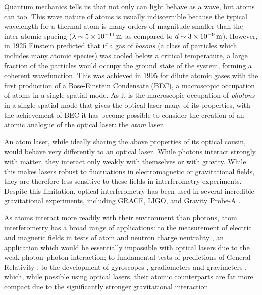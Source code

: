 Quantum mechanics tells us that not only can light behave as a wave, but atoms can too.  This wave nature of atoms is usually indiscernible because the typical wavelength for a thermal atom is many orders of magnitude smaller than the inter-atomic spacing ($\lambda \sim 5 \times\unit[10^{-11}]{m}$ as compared to $d \sim 3 \times\unit[10^{-9}]{m}$).  However, in 1925 Einstein predicted \citep{Einstein:1925} that if a gas of \emph{bosons} (a class of particles which includes many atomic species) was cooled below a critical temperature, a large fraction of the particles would occupy the ground state of the system, forming a coherent wavefunction.  This was achieved in 1995 for dilute atomic gases \citep{Anderson:1995vn,Bradley:1995ys,Davis:1995} with the first production of a Bose-Einstein Condensate (BEC), a macroscopic occupation of atoms in a single spatial mode.  As it is the macroscopic occupation of \emph{photons} in a single spatial mode that gives the optical laser many of its properties, with the achievement of BEC it has become possible to consider the creation of an atomic analogue of the optical laser: the \emph{atom} laser.

An atom laser, while ideally sharing the above properties of its optical cousin, would behave very differently to an optical laser.  While photons interact strongly with matter, they interact only weakly with themselves or with gravity.  While this makes lasers robust to fluctuations in electromagnetic or gravitational fields, they are therefore less sensitive to these fields in interferometry experiments.  Despite this limitation, optical interferometry has been used in several incredible gravitational experiments, including GRACE, LIGO, and Gravity Probe-A \citep{Vessot:1980}.

As atoms interact more readily with their environment than photons, atom interferometry has a broad range of applications: to the measurement of electric and magnetic fields in tests of atom and neutron charge neutrality \citep{Arvanitaki:2008}, an application which would be essentially impossible with optical lasers due to the weak photon--photon interaction; to fundamental tests of predictions of General Relativity \citep{Dimopoulos:2007uq}; to the development of gyroscopes \citep{Gustavson:1997}, gradiometers \citep{Snadden:1998,McGuirk:2002} and gravimeters \citep{Peters:2001}, which, while possible using optical lasers, their atomic counterparts are far more compact due to the significantly stronger gravitational interaction.

